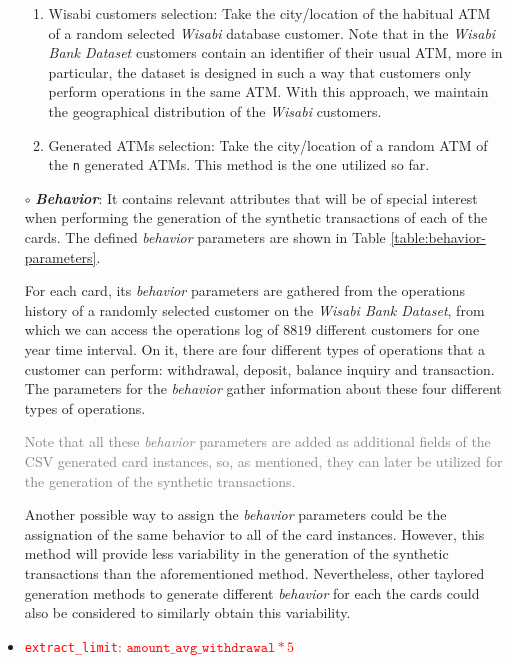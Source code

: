 \documentclass{article}
\begin{document}
\begin{itemize}
  \begin{enumerate}
      \item Wisabi customers selection: Take the city/location of the habitual ATM of a random selected \emph{Wisabi} database customer. Note that in the \emph{Wisabi Bank Dataset} customers contain an identifier
      of their usual ATM, more in particular, the dataset is designed in such a way that customers
      only perform operations in the same ATM.
      With this approach, we maintain the geographical distribution of the \emph{Wisabi} customers.
      \item Generated ATMs selection: Take the city/location of a random ATM of the \texttt{n} generated ATMs. This method is the one utilized so far.
  \end{enumerate}

\item[$\circ$]\textbf{\emph{Behavior}}: It contains relevant attributes that will be of special interest when performing the 
generation of the synthetic transactions of each of the cards. The defined \emph{behavior}
parameters are shown in Table \ref{table:behavior-parameters}. 



For each card, its \emph{behavior} parameters are gathered from the operations history of a randomly selected customer on the \emph{Wisabi Bank Dataset}, from which we can access the operations log of $8819$ different customers for one year time interval. On it, there are four different types of operations that a customer can perform: withdrawal, deposit, balance inquiry and transaction. The parameters
for the \emph{behavior} gather information about these four different types of operations.

\textcolor{gray}{Note that all these \emph{behavior} parameters are added as additional fields of the CSV generated card instances, so, as mentioned, they can later be utilized for the generation of the synthetic
transactions.}

Another possible way to assign the \emph{behavior} parameters could be the assignation
of the same behavior to all of the card instances. However, this method will provide less variability in
the generation of the synthetic transactions than the aforementioned method. 
Nevertheless, other taylored generation methods to generate different \emph{behavior} for 
each the cards could also be considered to similarly obtain this
variability.

\item \textcolor{red}{\texttt{extract\_limit}: $\texttt{amount\_avg\_withdrawal} * 5$}
\end{itemize}
\end{document}
